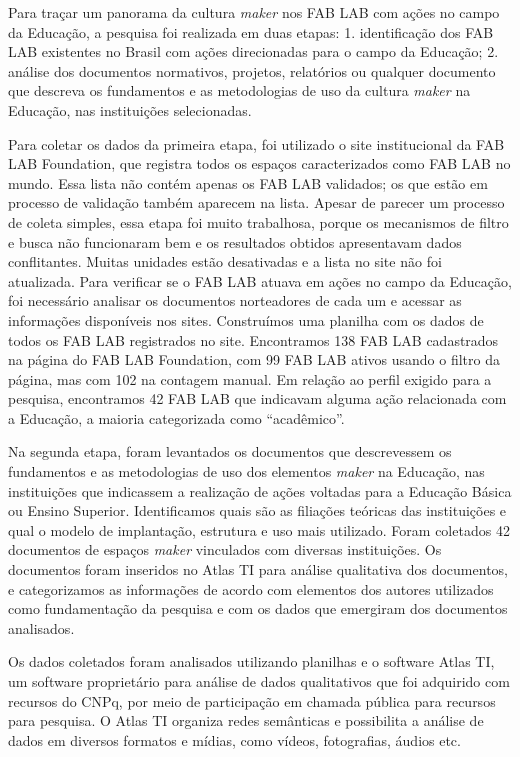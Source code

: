 \documentclass[portuguese]{textolivre}
\begin{document}
Para traçar um panorama da cultura \textit{maker} nos FAB LAB com ações no campo da Educação, a pesquisa foi realizada em duas etapas: 1. identificação dos FAB LAB existentes no Brasil com ações direcionadas para o campo da Educação; 2. análise dos documentos normativos, projetos, relatórios ou qualquer documento que descreva os fundamentos e as metodologias de uso da cultura \textit{maker} na Educação, nas instituições selecionadas.

Para coletar os dados da primeira etapa, foi utilizado o site institucional da FAB LAB Foundation, que registra todos os espaços caracterizados como FAB LAB no mundo. Essa lista não contém apenas os FAB LAB validados; os que estão em processo de validação também aparecem na lista. Apesar de parecer um processo de coleta simples, essa etapa foi muito trabalhosa, porque os mecanismos de filtro e busca não funcionaram bem e os resultados obtidos apresentavam dados conflitantes. Muitas unidades estão desativadas e a lista no site não foi atualizada. Para verificar se o FAB LAB atuava em ações no campo da Educação, foi necessário analisar os documentos norteadores de cada um e acessar as informações disponíveis nos sites. Construímos uma planilha com os dados de todos os FAB LAB registrados no site. Encontramos 138 FAB LAB cadastrados na página do FAB LAB Foundation, com 99 FAB LAB ativos usando o filtro da página, mas com 102 na contagem manual. Em relação ao perfil exigido para a pesquisa, encontramos 42 FAB LAB que indicavam alguma ação relacionada com a Educação, a maioria categorizada como ``acadêmico''.

Na segunda etapa, foram levantados os documentos que descrevessem os fundamentos e as metodologias de uso dos elementos \textit{maker} na Educação, nas instituições que indicassem a realização de ações voltadas para a Educação Básica ou Ensino Superior. Identificamos quais são as filiações teóricas das instituições e qual o modelo de implantação, estrutura e uso mais utilizado. Foram coletados 42 documentos de espaços \textit{maker} vinculados com diversas instituições. Os documentos foram inseridos no Atlas TI para análise qualitativa dos documentos, e categorizamos as informações de acordo com elementos dos autores utilizados como fundamentação da pesquisa e com os dados que emergiram dos documentos analisados.

Os dados coletados foram analisados utilizando planilhas e o software Atlas TI, um software proprietário para análise de dados qualitativos que foi adquirido com recursos do CNPq, por meio de participação em chamada pública para recursos para pesquisa. O Atlas TI organiza redes semânticas e possibilita a análise de dados em diversos formatos e mídias, como vídeos, fotografias, áudios etc.
\end{document}
